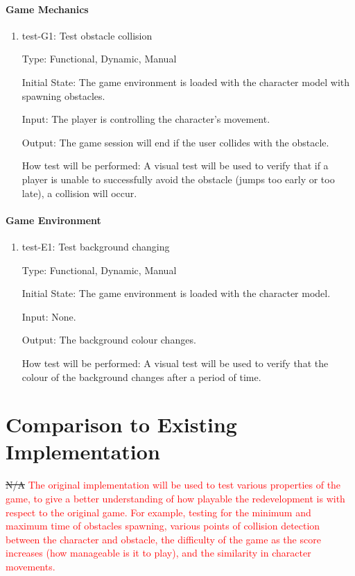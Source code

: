 \documentclass[12pt, titlepage]{article}
\begin{document}
\paragraph{Game Mechanics}	
\begin{enumerate}
\item{test-G1: Test obstacle collision\\}

Type: Functional, Dynamic, Manual
					
Initial State: The game environment is loaded with the character model with spawning obstacles.
					
Input: The player is controlling the character's movement.

Output: The game session will end if the user collides with the obstacle.
					
How test will be performed: A visual test will be used to verify that if a player is unable to successfully avoid the obstacle (jumps too early or too late), a collision will occur.
\end{enumerate}

\paragraph{Game Environment}
\begin{enumerate}
\item{test-E1: Test background changing\\}

Type: Functional, Dynamic, Manual
					
Initial State: The game environment is loaded with the character model.
					
Input: None.
					
Output: The background colour changes.
					
How test will be performed: A visual test will be used to verify that the colour of the background changes after a period of time.
\end{enumerate}


	
\section{Comparison to Existing Implementation}	
\sout{N/A} \textcolor{red}{The original implementation will be used to test various properties of the game, to give a better understanding of how playable the redevelopment is with respect to the original game. For example, testing for the minimum and maximum time of obstacles spawning, various points of collision detection between the character and obstacle, the difficulty of the game as the score increases (how manageable is it to play), and the similarity in character movements.}
\end{document}
